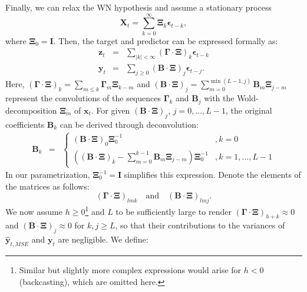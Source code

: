 \documentclass[11pt,a4paper]{article}
\begin{document}
Finally, we can relax the WN hypothesis and assume a stationary process 
\begin{equation}\label{x_m_st}
\mathbf{X}_t = \sum_{k=0}^\infty \boldsymbol{\Xi}_k \boldsymbol{\epsilon}_{t-k},
\end{equation}
where $\boldsymbol{\Xi}_0 = \mathbf{I}$. Then, the target and predictor can be expressed formally as:
\begin{eqnarray*}
\mathbf{z}_t&=&\sum_{|k|<\infty}(\boldsymbol{\Gamma}\cdot\boldsymbol{\Xi})_k \boldsymbol{\epsilon}_{t-k}\\
\mathbf{y}_t&=&\sum_{j\geq 0} (\mathbf{B}\cdot\boldsymbol{\Xi})_j\boldsymbol{\epsilon}_{t-j}.
\end{eqnarray*} 
Here, $(\boldsymbol{\Gamma}\cdot\boldsymbol{\Xi})_k =\sum_{m\leq k}\boldsymbol{\Gamma}_m\boldsymbol{\Xi}_{k-m}$ and $(\mathbf{B}\cdot\boldsymbol{\Xi})_j=\sum_{m=0}^{\min(L-1,j)}\mathbf{B}_m \boldsymbol{\Xi}_{j-m} $ represent the convolutions of the sequences $\boldsymbol{\Gamma}_k$ and $\mathbf{B}_j$ with the Wold-decomposition $\boldsymbol{\Xi}_m$ of $\mathbf{x}_t$. For  given $(\mathbf{B}\cdot\boldsymbol{\Xi})_j$, $j=0,...,L-1$, the original coefficients $\mathbf{B}_{k}$ can be derived through deconvolution:
\begin{eqnarray}\label{con_inv}
\mathbf{B}_{k}&=&\left\{\begin{array}{cc}(\mathbf{B}\cdot\boldsymbol{\Xi})_{0}\boldsymbol{\Xi}_0^{-1}&,k=0\\
\left(  (\mathbf{B}\cdot\boldsymbol{\Xi})_{k}-\sum_{m=0}^{k-1}\mathbf{B}_m \boldsymbol{\Xi}_{j-m}\right)\boldsymbol{\Xi}_0^{-1}&,k=1,...,L-1
\end{array}\right.
\end{eqnarray}
In our parametrization, $\boldsymbol{\Xi}_0^{-1} = \mathbf{I}$ simplifies this expression. Denote the elements of the matrices as follows:
\[
(\boldsymbol{\Gamma}\cdot\boldsymbol{\Xi})_{lmk}
 \quad \text{and} \quad (\mathbf{B}\cdot\boldsymbol{\Xi})_{lmj}.
 \] 
We now assume $h\geq 0$\footnote{Similar but slightly more complex expressions would arise for $h < 0$ (backcasting), which are omitted here.} and $L$ to be sufficiently large to render $(\boldsymbol{\Gamma} \cdot \boldsymbol{\Xi})_{h+k} \approx 0$ and $(\mathbf{B} \cdot \boldsymbol{\Xi})_j \approx 0$ for $k,j \geq L$, so that  their contributions to the variances of $\hat{\mathbf{y}}_{t,MSE}$ and $\mathbf{y}_t$ are negligible. We define:
\end{document}
